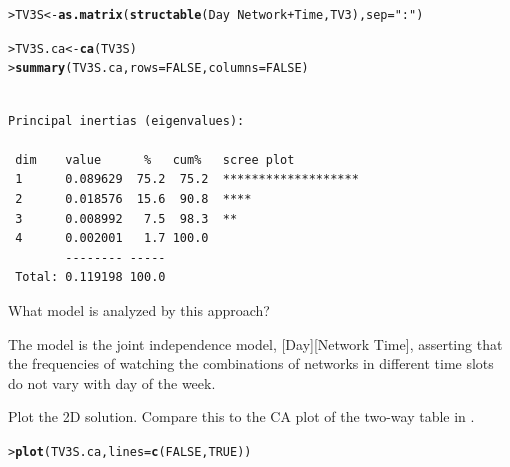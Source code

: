 \documentclass[10pt]{report}\usepackage[]{graphicx}\usepackage[]{color}
\makeatletter
\newcommand{\hlnum}[1]{\textcolor[rgb]{0.686,0.059,0.569}{#1}}%
\newcommand{\hlstr}[1]{\textcolor[rgb]{0.192,0.494,0.8}{#1}}%
\newcommand{\hlopt}[1]{\textcolor[rgb]{0,0,0}{#1}}%
\newcommand{\hlstd}[1]{\textcolor[rgb]{0.345,0.345,0.345}{#1}}%
\newcommand{\hlkwb}[1]{\textcolor[rgb]{0.69,0.353,0.396}{#1}}%
\newcommand{\hlkwc}[1]{\textcolor[rgb]{0.333,0.667,0.333}{#1}}%
\newcommand{\hlkwd}[1]{\textcolor[rgb]{0.737,0.353,0.396}{\textbf{#1}}}%
\newenvironment{kframe}{%
 \def\at@end@of@kframe{}%
 \ifinner\ifhmode%
  \def\at@end@of@kframe{\end{minipage}}%
  \begin{minipage}{\columnwidth}%
 \fi\fi%
 \def\FrameCommand##1{\hskip\@totalleftmargin \hskip-\fboxsep
 \colorbox{shadecolor}{##1}\hskip-\fboxsep
     \hskip-\linewidth \hskip-\@totalleftmargin \hskip\columnwidth}%
 \MakeFramed {\advance\hsize-\width
   \@totalleftmargin\z@ \linewidth\hsize
   \@setminipage}}%
 {\par\unskip\endMakeFramed%
 \at@end@of@kframe}
\newenvironment{knitrout}{}{} %
\renewenvironment{knitrout}{\small\renewcommand{\baselinestretch}{.85}}{} %
\makeatother
\begin{document}
\begin{Exercises}
\begin{enumerate*}
\begin{knitrout}
\begin{kframe}
\begin{alltt}
\hlstd{> }\hlstd{TV3S} \hlkwb{<-} \hlkwd{as.matrix}\hlstd{(}\hlkwd{structable}\hlstd{(Day} \hlopt{~} \hlstd{Network} \hlopt{+} \hlstd{Time, TV3),} \hlkwc{sep}\hlstd{=}\hlstr{":"}\hlstd{)}
\end{alltt}
\end{kframe}
\end{knitrout}
		\begin{ans}
\begin{knitrout}\footnotesize
{}\color{fgcolor}\begin{kframe}
\begin{alltt}
\hlstd{> }\hlstd{TV3S.ca} \hlkwb{<-}\hlkwd{ca}\hlstd{(TV3S)}
\hlstd{> }\hlkwd{summary}\hlstd{(TV3S.ca,} \hlkwc{rows}\hlstd{=}\hlnum{FALSE}\hlstd{,} \hlkwc{columns}\hlstd{=}\hlnum{FALSE}\hlstd{)}
\end{alltt}
\begin{verbatim}

Principal inertias (eigenvalues):

 dim    value      %   cum%   scree plot               
 1      0.089629  75.2  75.2  *******************      
 2      0.018576  15.6  90.8  ****                     
 3      0.008992   7.5  98.3  **                       
 4      0.002001   1.7 100.0                           
        -------- -----                                 
 Total: 0.119198 100.0                                 
\end{verbatim}
\end{kframe}
\end{knitrout}
		\end{ans}

    \item What \loglin model is analyzed by this approach?
    \begin{ans}
    The model is the joint independence model, [Day][Network Time], asserting that 
    the frequencies of watching the combinations of networks in different time
    slots do not vary with day of the week.
    \end{ans}
    
    \item Plot the 2D solution.  Compare this to the CA plot of the two-way table in .
    \begin{ans}
\begin{knitrout}\footnotesize
{}\color{fgcolor}\begin{kframe}
\begin{alltt}
\hlstd{> }\hlkwd{plot}\hlstd{(TV3S.ca,} \hlkwc{lines}\hlstd{=}\hlkwd{c}\hlstd{(}\hlnum{FALSE}\hlstd{,} \hlnum{TRUE}\hlstd{))}
\end{alltt}
\end{kframe}


\end{knitrout}
\end{ans}
\end{enumerate*}
\end{Exercises}
\end{document}

